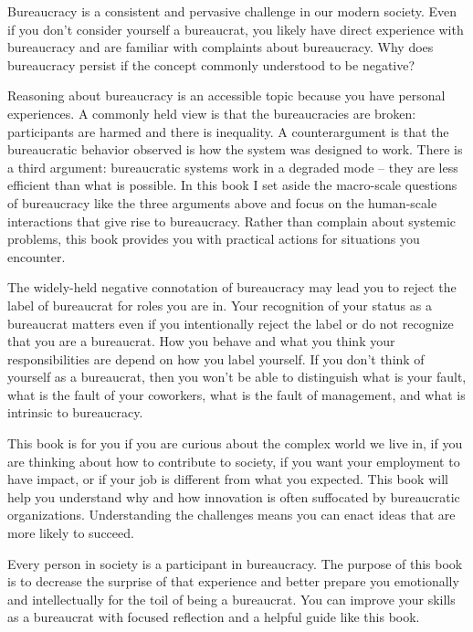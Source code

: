 
Bureaucracy is a consistent and pervasive challenge in our modern society. 
Even if you don't consider yourself a bureaucrat, you likely have direct experience with bureaucracy and are familiar with complaints about bureaucracy. 
Why does bureaucracy persist if the concept commonly understood to be negative?


Reasoning about bureaucracy is an accessible topic because you have personal experiences.
A commonly held view is that the bureaucracies are broken: participants are harmed and there is inequality. 
A counterargument is that the bureaucratic behavior observed is how the system was designed to work. There is a third argument: bureaucratic systems work in a degraded mode -- they are less efficient than what is possible. 
In this book I set aside the macro-scale questions of bureaucracy like the three arguments above and focus on the human-scale interactions that give rise to bureaucracy. Rather than complain about systemic problems, this book provides you with practical actions for situations you encounter.

The widely-held negative connotation of bureaucracy may lead you to reject the label of bureaucrat for roles you are in. Your recognition of your status as a bureaucrat matters even if you intentionally reject the label or do not recognize that you are a bureaucrat. How you behave and what you think your responsibilities are depend on how you label yourself.
If you don't think of yourself as a bureaucrat, then you won't be able to distinguish what is your fault, what is the fault of your coworkers, what is the fault of management, and what is intrinsic to bureaucracy. 


This book is for you if you are curious about the complex world we live in,  if you are thinking about how to contribute to society,  if you want your employment to have impact, or if your job is different from what you expected. This book will help you understand why and how innovation is often suffocated by bureaucratic organizations. Understanding the challenges means you can enact ideas that are more likely to succeed.

Every person in society is a participant in bureaucracy. The purpose of this book is to decrease the surprise of that experience and better prepare you emotionally and intellectually for the toil of being a bureaucrat. You can improve your skills as a bureaucrat with focused reflection and a helpful guide like this book. 

